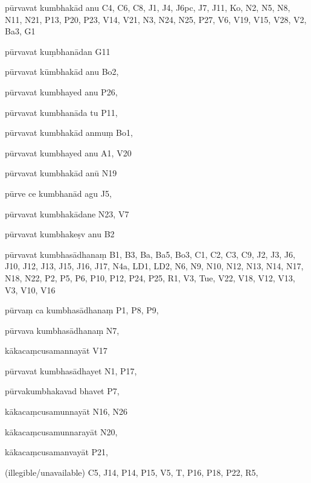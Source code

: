 \begin{marma}[hp02_009]
\begin{marma}[hp02_011]
 \begin{marma}[hp02_58b]
\item[pūrvavat kumbhakād anu] C4, C6, C8, J1, J4, J6pc, J7, J11, Ko, N2, N5, N8, N11, N21, P13, P20, P23, V14, V21, N3, N24, N25, P27, V6, V19, V15, V28, V2, Ba3, G1
\item[pūrvavat kuṃbhanādan] G11
\item[pūrvavat kūmbhakād anu] Bo2,
\item[pūrvavat kumbhayed anu] P26,
\item[pūrvavat kumbhanāda tu] P11,
\item[pūrvavat kumbhakād anmuṃ] Bo1,
\item[pūrvavat kumbhayed anu] A1, V20
\item[pūrvavat kumbhakād anū] N19
\item[pūrve ce kumbhanād agu] J5,
\item[pūrvavat kumbhakādane] N23, V7
\item[pūrvavat kumbhakeṣv anu] B2
\item[pūrvavat kumbhasādhanaṃ] B1, B3, Ba, Ba5, Bo3, C1, C2, C3, C9, J2, J3, J6, J10, J12, J13, J15, J16, J17, N4a, LD1, LD2, N6, N9, N10, N12, N13, N14, N17, N18, N22, P2, P5, P6, P10, P12, P24, P25, R1, V3, Tue, V22, V18, V12, V13, V3, V10, V16
\item[pūrvaṃ ca  kumbhasādhanaṃ] P1, P8, P9, 
\item[pūrvava kumbhasādhanaṃ] N7, 
\item[kākacaṃcusamannayāt] V17
\item[pūrvavat kumbhasādhayet] N1, P17, 
\item[pūrvakumbhakavad bhavet] P7,
\item[kākacaṃcusamunnayāt] N16, N26
\item[kākacaṃcusamunnarayāt] N20, 
\item[kākacaṃcusamanvayāt] P21, 
\item[(illegible/unavailable)] C5, J14, P14, P15, V5, T, P16, P18, P22, R5,
  \begin{description}

    \end{description}
 \end{marma}


\end{marma}
\end{marma}
